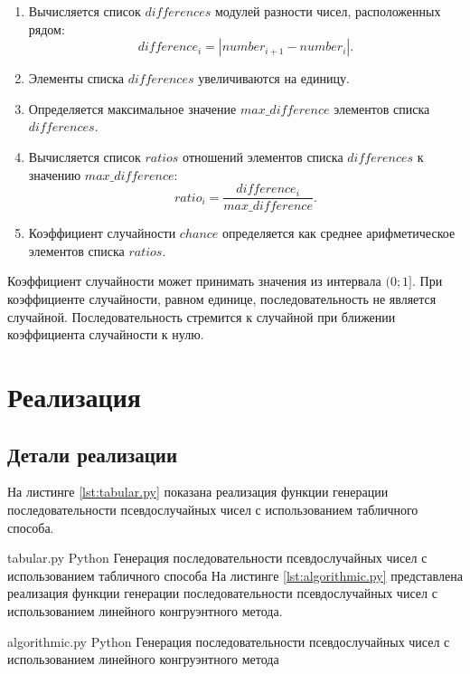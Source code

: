 \begin{enumerate}
	\item Вычисляется список $differences$ модулей разности чисел, расположенных рядом:
		\begin{equation}
			difference_{i} = |number_{i + 1} - number_{i}|.
		\end{equation}
	\item Элементы списка $differences$ увеличиваются на единицу.
	\item Определяется максимальное значение $max\_difference$ элементов списка $differences$.
	\item Вычисляется список $ratios$ отношений элементов списка $differences$ к значению $max\_difference$:
		\begin{equation}
			ratio_{i} = \frac{difference_{i}}{max\_difference}.
		\end{equation}
	\item Коэффициент случайности $chance$ определяется как среднее арифметическое элементов списка $ratios$.
\end{enumerate}

Коэффициент случайности может принимать значения из интервала $(0;1]$. При коэффициенте случайности, равном единице, последовательность не является случайной. Последовательность стремится к случайной при ближении коэффициента случайности к нулю.

\chapter{Реализация}

\section{Детали реализации}

На листинге \ref{lst:tabular.py} показана реализация функции генерации последовательности псевдослучайных чисел с использованием табличного способа.

    {tabular.py}
    {Python}
    {Генерация последовательности псевдослучайных чисел с использованием табличного способа}
\newpage
На листинге \ref{lst:algorithmic.py} представлена реализация функции генерации последовательности псевдослучайных чисел с использованием линейного конгруэнтного метода.

    {algorithmic.py}
    {Python}
    {Генерация последовательности псевдослучайных чисел с использованием линейного конгруэнтного метода}
    
